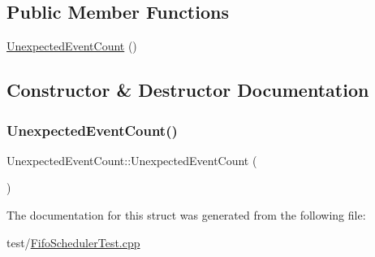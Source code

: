 \subsection*{Public Member Functions}
\begin{DoxyCompactItemize}
\item 
\mbox{\hyperlink{struct_unexpected_event_count_af70d5c5ebede693770227984d23e4c75}{Unexpected\+Event\+Count}} ()
\end{DoxyCompactItemize}


\subsection{Constructor \& Destructor Documentation}
\mbox{\label{struct_unexpected_event_count_af70d5c5ebede693770227984d23e4c75}} 
\subsubsection{\texorpdfstring{Unexpected\+Event\+Count()}{UnexpectedEventCount()}}
{\footnotesize\ttfamily Unexpected\+Event\+Count\+::\+Unexpected\+Event\+Count (\begin{DoxyParamCaption}{ }\end{DoxyParamCaption})\hspace{0.3cm}{\ttfamily [inline]}}



The documentation for this struct was generated from the following file\+:\begin{DoxyCompactItemize}
\item 
test/\mbox{\hyperlink{_fifo_scheduler_test_8cpp}{Fifo\+Scheduler\+Test.\+cpp}}\end{DoxyCompactItemize}
